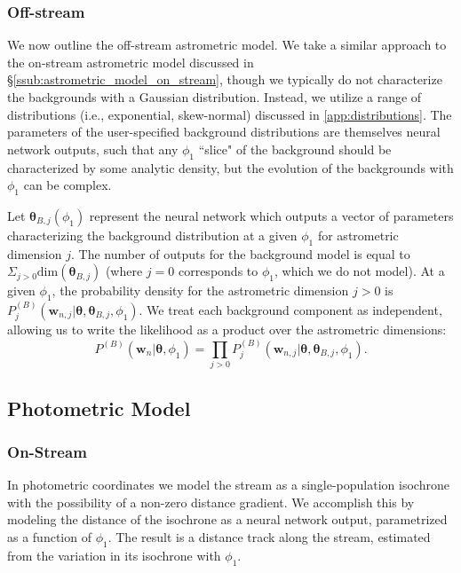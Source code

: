 \documentclass[twocolumn]{aastex631}
\newcommand{\mbs}[1]{\boldsymbol{#1}}
\newcommand{\pdf}{P}
\begin{document}
        \subsubsection{Off-stream} \label{ssub:astrometric_model_off_stream}
    
            We now outline the off-stream astrometric model. We take a similar approach to the on-stream astrometric model discussed in \S\ref{ssub:astrometric_model_on_stream}, though we typically do not characterize the backgrounds with a Gaussian distribution. Instead, we utilize a range of distributions (i.e., exponential, skew-normal) discussed in \autoref{app:distributions}. The parameters of the user-specified background distributions are themselves neural network outputs, such that any $\phi_1$ ``slice" of the background should be characterized by some analytic density, but the evolution of the backgrounds with $\phi_1$ can be complex. 
    
            Let $\mbs{\theta}_{B,j}(\phi_1)$ represent the neural network which outputs a vector of parameters characterizing the background distribution at a given $\phi_1$ for astrometric dimension $j$. The number of outputs for the background model is equal to $\Sigma_{j>0} \mathrm{dim}\left(\mbs{\theta}_{B,j}\right)$ (where $j=0$ corresponds to $\phi_1$, which we do not model). At a given $\phi_1$, the probability density for the astrometric dimension $j>0$ is $\pdf^{(B)}_j\left(\mbs{w}_{n,j} | \mbs{\theta}, \mbs{\theta}_{B,j}, \phi_1 \right)$. We treat each background component as independent, allowing us to write the likelihood as a product over the astrometric dimensions:
            \begin{equation}
                \pdf^{(B)}\left(\mbs{w}_n | \mbs{\theta}, \phi_1 \right) = \prod_{j>0} \pdf_j^{(B)}\left(\mbs{w}_{n,j} | \mbs{\theta}, \mbs{\theta}_{B,j}, \phi_1 \right).
            \end{equation}
    

        

    
    
        
        

    \subsection{Photometric Model} \label{sub:photometric_model}

        \subsubsection{On-Stream} \label{sub:photometric_model_on_stream}
            In photometric coordinates we model the stream as a single-population isochrone with the possibility of a non-zero distance gradient. We accomplish this by modeling the distance of the isochrone as a neural network output, parametrized as a function of $\phi_1$. The result is a distance track along the stream, estimated from the variation in its isochrone with $\phi_1$. 
            
\end{document}
